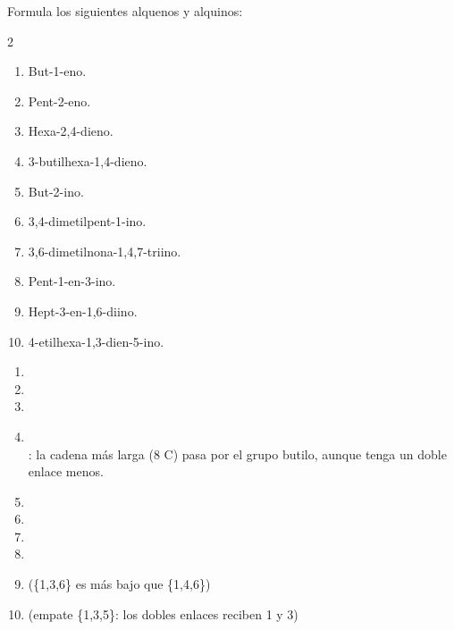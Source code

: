 \begin{exercise}
    Formula los siguientes alquenos y alquinos:
    \begin{multicols}{2}
        \begin{enumerate}[label=\alph*)]
            \item But-1-eno.
            \item Pent-2-eno.
            \item Hexa-2,4-dieno.
            \item 3-butilhexa-1,4-dieno.
            \item But-2-ino.
            \item 3,4-dimetilpent-1-ino.
            \item 3,6-dimetilnona-1,4,7-triino.
            \item Pent-1-en-3-ino.
            \item Hept-3-en-1,6-diino.
            \item 4-etilhexa-1,3-dien-5-ino.
        \end{enumerate}
    \end{multicols}
    \begin{solu}
        \begin{enumerate}[label=\alph*)]
            \item {}
            \item {}
            \item {}
            \item {}\\
                  : la cadena más larga (8 C) pasa por el grupo butilo, aunque tenga un doble enlace menos.
            \item {}
            \item {}
            \item {}
            \item {}
            \item {} \quad (\{1,3,6\} es más bajo que \{1,4,6\})
            \item {} \quad (empate \{1,3,5\}: los dobles enlaces reciben 1 y 3)
        \end{enumerate}
    \end{solu}
\end{exercise}

